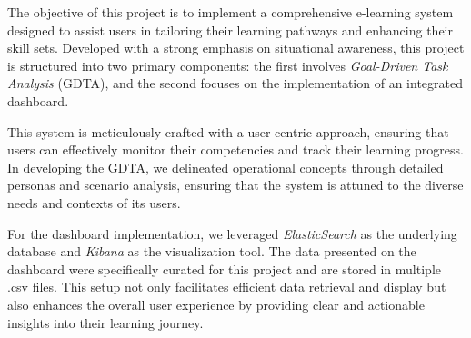 The objective of this project is to implement a comprehensive e-learning system designed to assist users in tailoring their learning pathways and enhancing their skill sets. Developed with a strong emphasis on situational awareness, this project is structured into two primary components: the first involves \textit{Goal-Driven Task Analysis} (GDTA), and the second focuses on the implementation of an integrated dashboard.

This system is meticulously crafted with a user-centric approach, ensuring that users can effectively monitor their competencies and track their learning progress. In developing the GDTA, we delineated operational concepts through detailed personas and scenario analysis, ensuring that the system is attuned to the diverse needs and contexts of its users.

For the dashboard implementation, we leveraged \textit{ElasticSearch} as the underlying database and \textit{Kibana} as the visualization tool. The data presented on the dashboard were specifically curated for this project and are stored in multiple .csv files. This setup not only facilitates efficient data retrieval and display but also enhances the overall user experience by providing clear and actionable insights into their learning journey.


